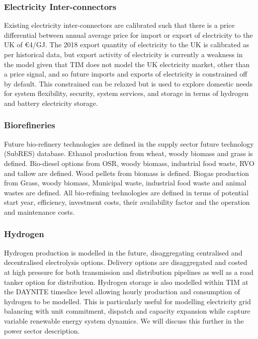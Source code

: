\documentclass[journal abbreviation, manuscript]{copernicus}
\begin{document}
\subsubsection{Electricity Inter-connectors}
Existing electricity inter-connectors are calibrated such that there is a price differential between annual average price for import or export of electricity to the UK of \euro{4}/GJ. The 2018 export quantity of electricity to the UK is calibrated as per historical data, but export activity of electricity is currently a weakness in the model given that TIM does not model the UK electricity market, other than a price signal, and so future imports and exports of electricity is constrained off by default. This constrained can be relaxed but is used to explore domestic needs for system flexibility, security, system services, and storage in terms of hydrogen and battery electricity storage.

\subsubsection{Biorefineries}
Future bio-refinery technologies are defined in the supply sector future technology (SubRES) database. Ethanol production from wheat, woody biomass and grass is defined. Bio-diesel options from OSR, woody biomass, industrial food waste, RVO and tallow are defined. Wood pellets from biomass is defined. Biogas production from Grass, woody biomass, Municipal waste, industrial food waste and animal wastes are defined. All bio-refining technologies are defined in terms of potential start year, efficiency, investment costs, their availability factor and the operation and maintenance costs.

\subsubsection{Hydrogen}
Hydrogen production is modelled in the future, disaggregating centralised and decentralised electrolysis options. Delivery options are disaggregated and costed at high pressure for both transmission and distribution pipelines as well as a road tanker option for distribution. Hydrogen storage is also modelled within TIM at the DAYNITE timeslice level allowing hourly production and consumption of hydrogen to be modelled. This is particularly useful for modelling electricity grid balancing with unit commitment, dispatch and capacity expansion while capture variable renewable energy system dynamics. We will discuss this further in the power sector description. 
\end{document}
